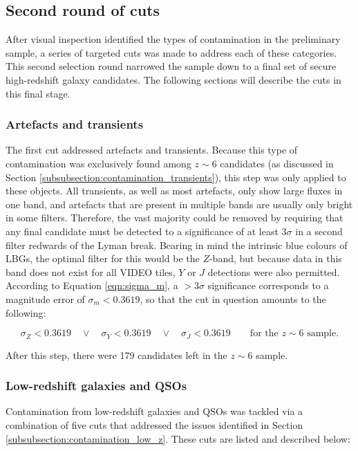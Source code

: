 \subsection{Second round of cuts}\label{subsection:second_cuts}
After visual inspection identified the types of contamination in the preliminary sample, a series of targeted cuts was made to address each of these categories. This second selection round narrowed the sample down to a final set of secure high-redshift galaxy candidates. The following sections will describe the cuts in this final stage. \par 


\subsubsection{Artefacts and transients}
The first cut addressed artefacts and transients. Because this type of contamination was exclusively found among $z\sim6$ candidates (as discussed in Section \ref{subsubsection:contamination_transients}), this step was only applied to these objects. All transients, as well as most artefacts, only show large fluxes in one band, and artefacts that are present in multiple bands are usually only bright in some filters. Therefore, the vast majority could be removed by requiring that any final candidate must be detected to a significance of at least $3\sigma$ in a second filter redwards of the Lyman break. Bearing in mind the intrinsic blue colours of LBGs, the optimal filter for this would be the $Z$-band, but because data in this band does not exist for all VIDEO tiles, $Y$ or $J$ detections were also permitted. According to Equation \ref{eqn:sigma_m}, a $> 3\sigma$ significance corresponds to a magnitude error of $\sigma_{m}< 0.3619$, so that the cut in question amounts to the following: 

\begin{equation}
    \sigma_{Z}< 0.3619  \quad \lor \quad \sigma_{Y}< 0.3619 \quad \lor \quad \sigma_{J}< 0.3619 \qquad \text{for the } z \sim 6 \text{ sample}.
\end{equation}

\noindent After this step, there were 179 candidates left in the $z\sim6$ sample. \par 


\subsubsection{Low-redshift galaxies and QSOs}\label{subsubsection:second_round_lowz}
Contamination from low-redshift galaxies and QSOs  was tackled via a combination of five cuts that addressed the issues identified in Section \ref{subsubsection:contamination_low_z}. These cuts are listed and described below: 

